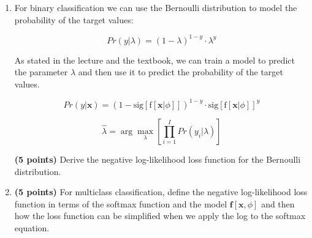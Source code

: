 \documentclass[11pt]{article}
\begin{document}
\begin{enumerate}
\textbf{(5 points)} Show step by step that the equation above simplifies to the
sum of squared errors loss function.

%

\newpage 

\item

For binary classification we can use the Bernoulli distribution to model the probability of the target values:

\begin{equation*}
  Pr(y | \lambda) =  (1 - \lambda)^{1 - y} \cdot \lambda^y
\end{equation*}

As stated in the lecture and the textbook, we can train a model to predict the parameter $\lambda$ and then use it to predict the probability of the target values.

\begin{equation*}
  Pr(y|\textbf{x}) = 
  (1 - \textrm{sig}[\textrm{f}[\textbf{x}|\phi]])^{1 - y} \cdot \textrm{sig}[\textrm{f}[\textbf{x}|\phi]]^y
\end{equation*}

\begin{equation*}
  \hat{\lambda} = \arg\max_{\lambda} \left[ \prod_{i=1}^{I} Pr(y_i | \lambda) \right]
\end{equation*}

\textbf{(5 points)} Derive the negative log-likelihood loss function for the Bernoulli distribution.

%

\newpage

\item

\textbf{(5 points)} For multiclass classification, define the negative log-likelihood loss function
in terms of the softmax function and the model $\mathbf{f}[\mathbf{x}, \phi]$
and then how the loss function can be simplified when we apply the log to the
softmax equation.


\end{enumerate}
\end{document}

